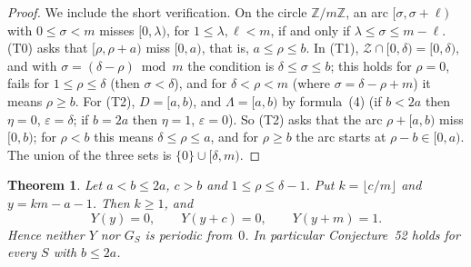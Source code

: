 \documentclass[11pt]{amsart}
\newtheorem{theorem}{Theorem}[section]
\theoremstyle{definition}
\numberwithin{equation}{section}
\newcommand{\Z}{\mathcal{Z}}
\begin{document}
\begin{proof}
We include the short verification. On the circle $\mathbb{Z}/m\mathbb{Z}$, an arc
$[\sigma,\sigma+\ell)$ with $0\le\sigma<m$ misses $[0,\lambda)$, for $1\le\lambda,\ell<m$, if and only if
$\lambda\le\sigma\le m-\ell$. (T0) asks that $[\rho,\rho+a)$ miss $[0,a)$, that is,
$a\le\rho\le b$. In (T1), $\Z\cap[0,\delta)=[0,\delta)$, and with
$\sigma=(\delta-\rho)\bmod m$ the condition is $\delta\le\sigma\le b$; this holds for
$\rho=0$, fails for $1\le\rho\le\delta$ (then $\sigma<\delta$), and for $\delta<\rho<m$
(where $\sigma=\delta-\rho+m$) it means $\rho\ge b$. For (T2), $D=[a,b)$, and $\Lambda=[a,b)$
by formula~(4) (if $b<2a$ then $\eta=0$, $\varepsilon=\delta$; if $b=2a$ then $\eta=1$,
$\varepsilon=0$). So (T2) asks that the arc $\rho+[a,b)$ miss $[0,b)$; for $\rho<b$ this
means $\delta\le\rho\le a$, and for $\rho\ge b$ the arc starts at $\rho-b\in[0,a)$. The union
of the three sets is $\{0\}\cup[\delta,m)$.
\end{proof}

\begin{theorem}\label{thm:band}
Let $a<b\le 2a$, $c>b$ and $1\le\rho\le\delta-1$. Put $k=\lfloor c/m\rfloor$ and
$y=km-a-1$. Then $k\ge1$, and
\[
Y(y)=0,\qquad Y(y+c)=0,\qquad Y(y+m)=1 .
\]
Hence neither $Y$ nor $G_S$ is periodic from~$0$. In particular Conjecture~52 holds for every
$S$ with $b\le 2a$.
\end{theorem}
\end{document}
